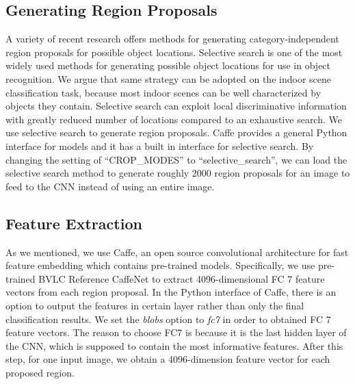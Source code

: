 \subsection{Generating Region Proposals}
A variety of recent research offers methods for generating category-independent
region proposals for possible object locations. Selective search is one of the
most widely used methods for generating possible object locations for use in
object recognition\cite{Uijlings:2013:SSO}. We argue that same strategy can be
adopted on the indoor scene classification task, because most indoor scenes can
be well characterized by objects they contain. Selective search can exploit
local discriminative information with greatly reduced number of locations
compared to an exhaustive search.  We use selective search to generate region
proposals. Caffe provides a general Python interface for models and it has
a built in interface for selective search. By changing the setting of
``CROP\_MODES'' to ``selective\_search'', we can load the selective search
method to generate roughly 2000 region proposals for an image to feed to the
CNN instead of using an entire image.

\subsection{Feature Extraction}
As we mentioned, we use Caffe, an open source convolutional architecture for
fast feature embedding which contains pre-trained models. Specifically, we use
pre-trained BVLC Reference CaffeNet to extract 4096-dimensional FC 7 feature
vectors from each region proposal. In the Python interface of Caffe, there is
an option to output the features in certain layer rather than only the final
classification results. We set the \textit{blobs} option to \textit{fc7} in
order to obtained FC 7 feature vectors.  The reason to choose FC7 is because it
is the last hidden layer of the CNN, which is supposed to contain the most
informative features. After this step, for one input image, we obtain
a 4096-dimension feature vector for each proposed region.

